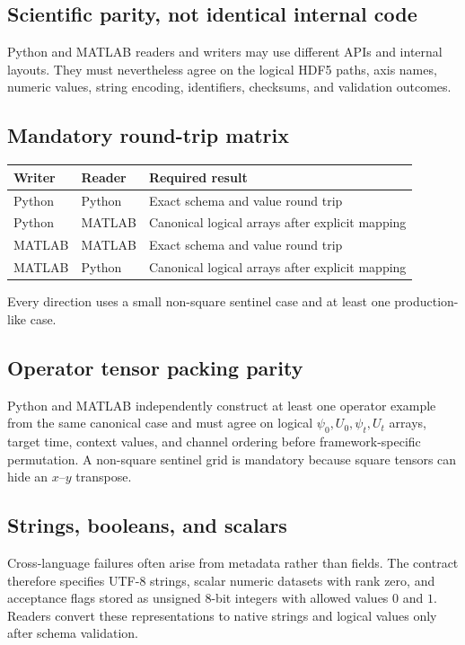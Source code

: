 \documentclass[11pt]{article}
\begin{document}
\subsection{Scientific parity, not identical internal code}

Python and MATLAB readers and writers may use different APIs and internal layouts. They must nevertheless agree on the logical HDF5 paths, axis names, numeric values, string encoding, identifiers, checksums, and validation outcomes.

\subsection{Mandatory round-trip matrix}

\begin{center}
\begin{tabular}{lll}
\toprule
Writer & Reader & Required result \\
\midrule
Python & Python & Exact schema and value round trip \\
Python & MATLAB & Canonical logical arrays after explicit mapping \\
MATLAB & MATLAB & Exact schema and value round trip \\
MATLAB & Python & Canonical logical arrays after explicit mapping \\
\bottomrule
\end{tabular}
\end{center}

Every direction uses a small non-square sentinel case and at least one production-like case.

\subsection{Operator tensor packing parity}
Python and MATLAB independently construct at least one operator example from the same canonical case and must agree on logical $\psi_0,U_0,\psi_t,U_t$ arrays, target time, context values, and channel ordering before framework-specific permutation. A non-square sentinel grid is mandatory because square tensors can hide an $x$--$y$ transpose.

\subsection{Strings, booleans, and scalars}

Cross-language failures often arise from metadata rather than fields. The contract therefore specifies UTF-8 strings, scalar numeric datasets with rank zero, and acceptance flags stored as unsigned 8-bit integers with allowed values $0$ and $1$. Readers convert these representations to native strings and logical values only after schema validation.
\end{document}
